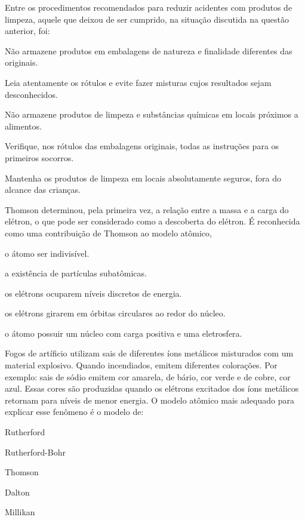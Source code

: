 \questao\label{prodlimp2}
Entre os procedimentos recomendados para reduzir acidentes com produtos de limpeza, aquele que deixou de ser cumprido, na situação discutida na questão anterior, foi:
\begin{alternativas}
\item Não armazene produtos em embalagens de natureza e finalidade diferentes das originais.
\item Leia atentamente os rótulos e evite fazer misturas cujos resultados sejam desconhecidos.
\item Não armazene produtos de limpeza e substâncias químicas em locais próximos a alimentos.
\item Verifique, nos rótulos das embalagens originais, todas as instruções para os primeiros socorros.
\item Mantenha os produtos de limpeza em locais absolutamente seguros, fora do alcance das crianças.
\end{alternativas}

\questao %
Thomson determinou, pela primeira vez, a relação entre a massa e a carga do elétron, o que pode ser considerado como a descoberta do elétron. É reconhecida como uma contribuição de Thomson ao modelo atômico,
\begin{alternativas}
\item o átomo ser indivisível.
\item a existência de partículas subatômicas.
\item os elétrons ocuparem níveis discretos de energia.
\item os elétrons girarem em órbitas circulares ao redor do núcleo.
\item o átomo possuir um núcleo com carga positiva e uma eletrosfera.
\end{alternativas}

\questao %
Fogos de artíficio utilizam sais de diferentes íons metálicos misturados com um material explosivo. Quando incendiados, emitem diferentes colorações. Por exemplo: sais de sódio emitem cor amarela, de bário, cor verde e de cobre, cor azul. Essas cores são produzidas quando os elétrons excitados dos íons metálicos retornam para níveis de menor energia. O modelo atômico mais adequado para explicar esse fenômeno é o modelo de:
\begin{alternativas}
\item Rutherford 
\item Rutherford-Bohr 
\item Thomson
\item Dalton
\item Millikan
\end{alternativas}

